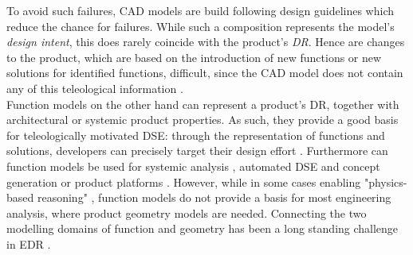 \documentclass[aerospace,article,submit,moreauthors,pdftex]{Definitions/mdpi}
\begin{document}
{%



To avoid such failures, CAD models are build following design guidelines which reduce the chance for failures.
While such a composition represents the model's \textit{design intent}, this does rarely coincide with the product's \textit{\acf{DR}}.
Hence are changes to the product, which are based on the introduction of new functions or new solutions for identified functions, difficult, since the CAD model does not contain any of this teleological information \citep{Umeda1997FunctionalDesign, Cohrs2014}.
\\

Function models on the other hand can represent a product's \ac{DR}, together with architectural or systemic product properties.
As such, they provide a good basis for teleologically motivated \ac{DSE}: through the representation of functions and solutions, developers can precisely target their design effort \citep{Levandowski2014SBCE}.
Furthermore can function models be used for systemic analysis \citep{albers2014}, automated \ac{DSE} and concept generation \citep{Helms2012, Jin2007} or product platforms \citep{landahl2018, Levandowski2014SBCE}.
However, while in some cases enabling "physics-based reasoning" \citep{Mokhtarian2017}, function models do not provide a basis for most engineering analysis, where product geometry models are needed.
Connecting the two modelling domains of function and geometry has been a long standing challenge in \ac{EDR} \citep{Umeda1997FunctionalDesign, Cohrs2014, Tomiyama2013}.
\\

}
\end{document}
